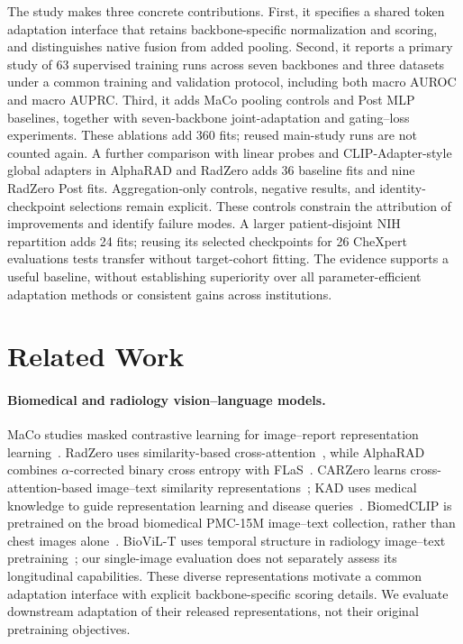 \documentclass[10pt,twocolumn,letterpaper]{article}
\begin{document}
The study makes three concrete contributions. First, it specifies a shared token adaptation interface that retains backbone-specific normalization and scoring, and distinguishes native fusion from added pooling. Second, it reports a primary study of 63 supervised training runs across seven backbones and three datasets under a common training and validation protocol, including both macro AUROC and macro AUPRC. Third, it adds MaCo pooling controls and Post MLP baselines, together with seven-backbone joint-adaptation and gating--loss experiments. These ablations add 360 fits; reused main-study runs are not counted again. A further comparison with linear probes and CLIP-Adapter-style global adapters in AlphaRAD and RadZero adds 36 baseline fits and nine RadZero Post fits. Aggregation-only controls, negative results, and identity-checkpoint selections remain explicit. These controls constrain the attribution of improvements and identify failure modes. A larger patient-disjoint NIH repartition adds 24 fits; reusing its selected checkpoints for 26 CheXpert evaluations tests transfer without target-cohort fitting. The evidence supports a useful baseline, without establishing superiority over all parameter-efficient adaptation methods or consistent gains across institutions.

\section{Related Work}
\paragraph{Biomedical and radiology vision--language models.}
MaCo studies masked contrastive learning for image--report representation learning~\cite{huang2024maco}. RadZero uses similarity-based cross-attention~\cite{park2025radzero}, while AlphaRAD combines $\alpha$-corrected binary cross entropy with FLaS~\cite{you2026alpharad}. CARZero learns cross-attention-based image--text similarity representations~\cite{lai2024carzero}; KAD uses medical knowledge to guide representation learning and disease queries~\cite{zhang2023kad}. BiomedCLIP is pretrained on the broad biomedical PMC-15M image--text collection, rather than chest images alone~\cite{zhang2025biomedclip}. BioViL-T uses temporal structure in radiology image--text pretraining~\cite{bannur2023biovilt}; our single-image evaluation does not separately assess its longitudinal capabilities. These diverse representations motivate a common adaptation interface with explicit backbone-specific scoring details. We evaluate downstream adaptation of their released representations, not their original pretraining objectives.
\end{document}
